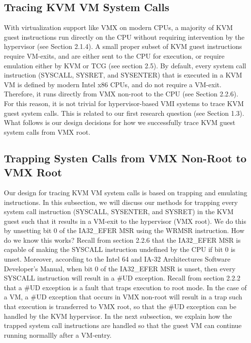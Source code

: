 \documentclass{report}
\begin{document}
\begin{spacing}{1.5}
\section{Tracing KVM VM System Calls}
{\large
With virtualization support like VMX on modern CPUs, a majority of KVM guest instructions run directly on the CPU without requiring intervention by the hypervisor (see Section 2.1.4). A small proper subset of KVM guest instructions require VM-exits, and are either sent to the CPU for execution, or require emulation either by KVM or TCG (see section 2.5). By default, every system call instruction (SYSCALL, SYSRET, and SYSENTER) that is executed in a KVM VM is defined by modern Intel x86 CPUs, and do not require a VM-exit. Therefore, it runs directly from VMX non-root to the CPU (see Section 2.2.6). For this reason, it is not trivial for hypervisor-based VMI systems to trace KVM guest system calls. This is related to our first research question (see Section 1.3). What follows is our design decisions for how we successfully trace KVM guest system calls from VMX root.
\newline
}


\subsection{Trapping Systen Calls from VMX Non-Root to VMX Root}
{\large
Our design for tracing KVM VM system calls is based on trapping and emulating instructions. In this subsection, we will discuss our methods for trapping every system call instruction (SYSCALL, SYSENTER, and SYSRET) in the KVM guest such that it results in a VM-exit to the hypervisor (VMX root). We do this by unsetting bit 0 of the IA32\_EFER MSR using the WRMSR instruction. How do we know this works? Recall from section 2.2.6 that the IA32\_EFER MSR is capable of making the SYSCALL instruction undefined by the CPU if bit 0 is unset. Moreover, according to the Intel 64 and IA-32 Architectures Software Developer’s Manual, when bit 0 of the IA32\_EFER MSR is unset, then every SYSCALL instruction will result in a \#UD exception. Recall from section 2.2.2 that a \#UD exception is a fault that traps execution to root mode. In the case of a VM, a \#UD exception that occurs in VMX non-root will result in a trap such that execution is transferred to VMX root, so that the \#UD exception can be handled by the KVM hypervisor. In the next subsection, we explain how the trapped system call instructions are handled so that the guest VM can continue running normallly after a VM-entry.
\newline
}



\end{spacing}
\end{document}
